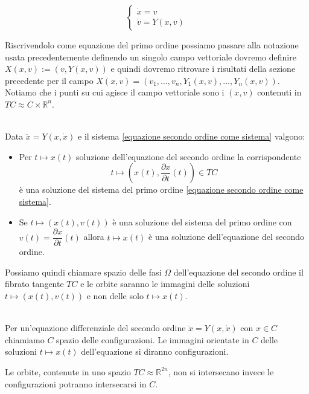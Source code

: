 \documentclass[11pt,a4paper,twoside]{book}
\newenvironment{proposizione}[1][\empty]{\begin{Proposizione}{
\ifx\empty#1\relax\else\mdseries\itshape#1\\\fi
}{}}{\end{Proposizione}}
\newenvironment{definizione}[1][\empty]{\begin{Definizione}{
\ifx\empty#1\relax\else\mdseries\itshape#1\\\fi
}{}}{\end{Definizione}}
\theoremstyle{esss}
\theoremstyle{dotless}
\numberwithin{equation}{section} %
\begin{document}
\begin{equation}\label{equazione secondo ordine come sistema}
\begin{cases}
\dot{x}=v \\
\dot{v}=Y(x,v)
\end{cases}
\end{equation}

Riscrivendolo come equazione del primo ordine possiamo passare alla notazione usata precedentemente definendo un singolo campo vettoriale dovremo definire $X(x,v):=(v,Y(x,v))$ e quindi dovremo ritrovare i risultati della sezione precedente per il campo $X(x,v)=(v_1,...,v_n,Y_1(x,v),...,Y_n(x,v))$.\\
Notiamo che i punti su cui agisce il campo vettoriale sono i $(x,v)$ contenuti in $T C \approx C \times \mathbb{R}^n$. 

\begin{proposizione} Data  $\ddot{x}=Y \left( x,\dot{x} \right)$ e il sistema \eqref{equazione secondo ordine come sistema} valgono:
\begin{itemize}
\item Per $t\mapsto x(t)$ soluzione dell'equazione del secondo ordine la corrispondente \[t\mapsto \left(x(t), \dfrac{\partial x}{\partial t}(t) \right) \in TC\] è una soluzione del sistema del primo ordine \eqref{equazione secondo ordine come sistema}.
\item Se $t \mapsto (x(t),v(t))$ è una soluzione del sistema del primo ordine con $v(t)=\dfrac{\partial x}{\partial t} (t)$ allora $t\mapsto x(t)$ è una soluzione dell'equazione del secondo ordine.
\end{itemize}
\end{proposizione}

Possiamo quindi chiamare spazio delle fasi $\Omega$ dell'equazione del secondo ordine il fibrato tangente $TC$ e le orbite saranno le immagini delle soluzioni $t\mapsto(x(t),v(t))$ e non delle solo $t\mapsto x(t)$.

\begin{definizione}
Per un'equazione differenziale del secondo ordine $\ddot{x}=Y(x,\dot{x})$ con $x\in C$ chiamiamo $C$ spazio delle configurazioni. Le immagini orientate in $C$ delle soluzioni $t\mapsto x(t)$ dell'equazione si diranno configurazioni. 
\end{definizione}



Le orbite, contenute in uno spazio $TC\approx\mathbb{R}^{2n}$, non si intersecano invece le configurazioni potranno intersecarsi in $C$.
\end{document}
